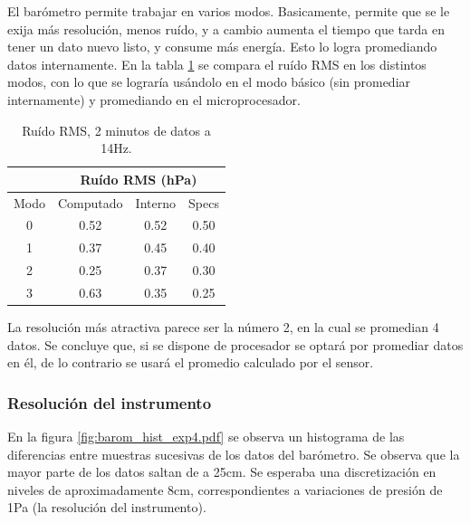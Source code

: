 \documentclass[spanish,12pt,a4paper,titlepage]{report}
\begin{document}
El barómetro permite trabajar en varios modos. Basicamente, permite que se le exija más resolución, menos ruído, y a cambio aumenta el tiempo que tarda en tener un dato nuevo listo, y consume más energía. Esto lo logra promediando datos internamente. En la tabla \ref{tab:ruido-rms} se compara el ruído RMS en los distintos modos, con lo que se lograría usándolo en el modo básico (sin promediar internamente) y promediando en el microprocesador.

\begin{table}[H]
\centering
\begin{tabular}{c|c|c|c|} 
\cline{2-4}
	& \multicolumn{3}{|c|}{\cellcolor[gray]{0.8} Ruído RMS  (hPa)}      \\ \hline
\multicolumn{1}{|c|}{\cellcolor[gray]{0.8} {Modo}} & \cellcolor[gray]{0.8} {Computado} &\cellcolor[gray]{0.8} {Interno} &\cellcolor[gray]{0.8} {Specs}\\ \hline

\multicolumn{1}{|c|}{0}	&	0.52	&	0.52	&	0.50\\
\hline
\multicolumn{1}{|c|}{1}	&	0.37	&	0.45	&	0.40\\
\hline
\multicolumn{1}{|c|}{2}	&	0.25	&	0.37	&	0.30\\
\hline
\multicolumn{1}{|c|}{3}	&	0.63	&	0.35	&	0.25\\
\hline

\end{tabular}
\caption{Ruído RMS, 2 minutos de datos a 14Hz.}
\label{tab:ruido-rms}
\end{table}
\vspace{-15pt}
La resolución más atractiva parece ser la número 2, en la cual se promedian 4 datos. Se concluye que, si se dispone de procesador se optará por promediar datos en él, de lo contrario se usará el promedio calculado por el sensor.

\subsubsection{Resolución del instrumento}
En la figura \ref{fig:barom_hist_exp4.pdf} se observa un histograma de las diferencias entre muestras sucesivas de los datos del barómetro. Se observa que la mayor parte de los datos saltan de a 25cm. Se esperaba una discretización en niveles de  aproximadamente 8cm, correspondientes a variaciones de presión de 1Pa (la resolución del instrumento).
\end{document}
